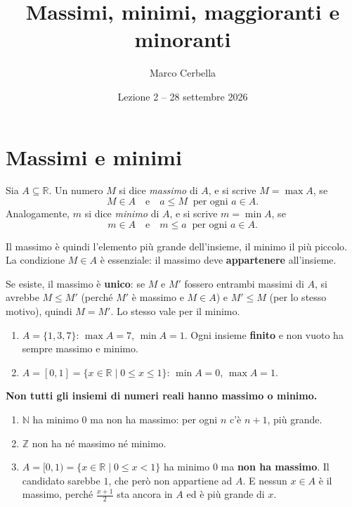 \documentclass[11pt,a4paper]{article}
\title{Massimi, minimi, maggioranti e minoranti}
\author{Marco Cerbella}
\date{Lezione 2 -- 28 settembre 2026}
\begin{document}
\maketitle

\section{Massimi e minimi}

\begin{definizione}
Sia $A \subseteq \mathbb{R}$. Un numero $M$ si dice \emph{massimo} di $A$,
e si scrive $M = \max A$, se
\[
M \in A \quad \text{e} \quad a \leq M \ \text{ per ogni } a \in A.
\]
Analogamente, $m$ si dice \emph{minimo} di $A$, e si scrive $m = \min A$, se
\[
m \in A \quad \text{e} \quad m \leq a \ \text{ per ogni } a \in A.
\]
\end{definizione}

Il massimo è quindi l'elemento più grande dell'insieme, il minimo il più
piccolo. La condizione $M \in A$ è essenziale: il massimo deve
\textbf{appartenere} all'insieme.

Se esiste, il massimo è \textbf{unico}: se $M$ e $M'$ fossero entrambi
massimi di $A$, si avrebbe $M \leq M'$ (perché $M'$ è massimo e $M \in A$) e
$M' \leq M$ (per lo stesso motivo), quindi $M = M'$. Lo stesso vale per il
minimo.

\begin{esempio}
\leavevmode
\begin{enumerate}
    \item $A = \{1, 3, 7\}$: $\max A = 7$, $\min A = 1$. Ogni insieme
          \textbf{finito} e non vuoto ha sempre massimo e minimo.
    \item $A = [0, 1] = \{x \in \mathbb{R} \mid 0 \leq x \leq 1\}$:
          $\min A = 0$, $\max A = 1$.
\end{enumerate}
\end{esempio}

\textbf{Non tutti gli insiemi di numeri reali hanno massimo o minimo.}

\begin{esempio}
\leavevmode
\begin{enumerate}
    \item $\mathbb{N}$ ha minimo $0$ ma non ha massimo: per ogni $n$ c'è
          $n + 1$, più grande.
    \item $\mathbb{Z}$ non ha né massimo né minimo.
    \item $A = [0, 1) = \{x \in \mathbb{R} \mid 0 \leq x < 1\}$ ha minimo
          $0$ ma \textbf{non ha massimo}. Il candidato sarebbe $1$, che però
          non appartiene ad $A$. E nessun $x \in A$ è il massimo, perché
          $\frac{x + 1}{2}$ sta ancora in $A$ ed è più grande di $x$.
\end{enumerate}
\end{esempio}
\end{document}
